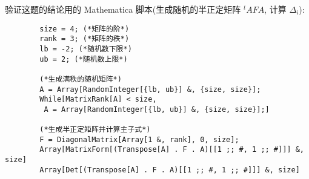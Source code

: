 \documentclass{ctexart}
\begin{document}
\begin{solution}

    

\end{solution}
\begin{note}
    验证这题的结论用的 Mathematica 脚本(生成随机的半正定矩阵 ${}^tAFA$, 计算 $\Delta_i$):
    \begin{verbatim}
        size = 4; (*矩阵的阶*)
        rank = 3; (*矩阵的秩*)
        lb = -2; (*随机数下限*)
        ub = 2; (*随机数上限*)

        (*生成满秩的随机矩阵*)
        A = Array[RandomInteger[{lb, ub}] &, {size, size}];
        While[MatrixRank[A] < size, 
         A = Array[RandomInteger[{lb, ub}] &, {size, size}];]
        
        (*生成半正定矩阵并计算主子式*)
        F = DiagonalMatrix[Array[1 &, rank], 0, size];
        Array[MatrixForm[(Transpose[A] . F . A)[[1 ;; #, 1 ;; #]]] &, size]
        Array[Det[(Transpose[A] . F . A)[[1 ;; #, 1 ;; #]]] &, size]
    \end{verbatim}
\end{note}
\end{document}
